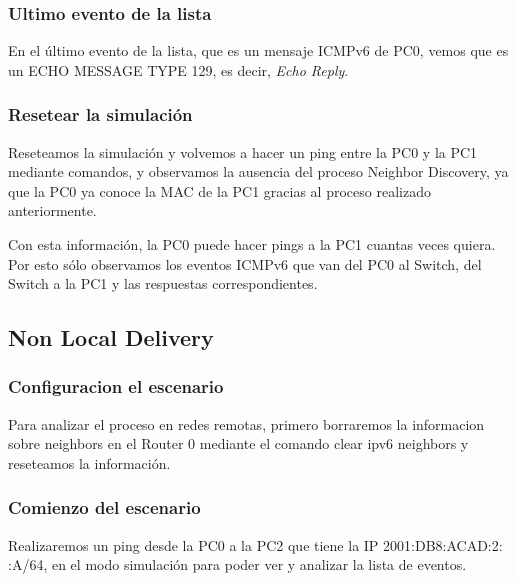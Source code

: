\documentclass[a4paper,12pt]{article}
\begin{document}
\bigskip

\subsubsection{Ultimo evento de la lista}

En el último evento de la lista, que es un mensaje ICMPv6 de PC0, vemos que es un ECHO MESSAGE TYPE 129, es decir, \textit{Echo Reply}.

\bigskip

\subsubsection{Resetear la simulación}

Reseteamos la simulación y volvemos a hacer un ping entre la PC0 y la PC1 mediante comandos, y observamos la ausencia del proceso Neighbor Discovery, ya que la PC0 ya conoce la MAC de la PC1 gracias al proceso realizado anteriormente.

\bigskip


Con esta información, la PC0 puede hacer pings a la PC1 cuantas veces quiera. Por esto sólo observamos los eventos ICMPv6 que van del PC0 al Switch, del Switch a la PC1 y las respuestas correspondientes. 

\bigskip




\subsection{Non Local Delivery}

\subsubsection{Configuracion el escenario}
Para analizar el proceso en redes remotas, primero borraremos la informacion sobre neighbors en el Router 0 mediante el comando clear ipv6 neighbors y reseteamos la información.\\
\subsubsection{Comienzo del escenario}
Realizaremos un ping desde la PC0 a la PC2 que tiene la IP 2001:DB8:ACAD:2: :A/64, en el modo simulación para poder ver y analizar la lista de eventos.\\
\end{document}
